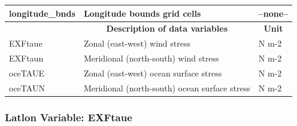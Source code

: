 \begin{longtable}{|m{}|m{}|m{}|}
longitude\_bnds &Longitude bounds grid cells &--none--  \\ \hline
\rowcolor{lightgray} \multicolumn{1}{|c|}{\textbf{Variables}} & \multicolumn{1}{|c|}{\textbf{Description of data variables}} &  \multicolumn{1}{|c|}{\textbf{Unit}}\\ \hline
EXFtaue &Zonal (east-west) wind stress &N m-2  \\ \hline
EXFtaun &Meridional (north-south) wind stress &N m-2  \\ \hline
oceTAUE &Zonal (east-west) ocean surface stress &N m-2  \\ \hline
oceTAUN &Meridional (north-south) ocean surface stress &N m-2  \\ \hline
\end{longtable}

\newp
\pagebreak
\subsubsection{Latlon Variable: EXFtaue}
